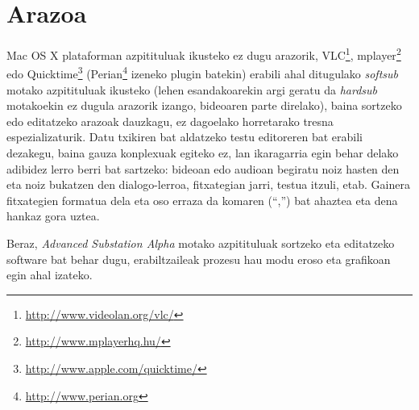 \section{Arazoa}
Mac OS X plataforman azpitituluak ikusteko ez dugu arazorik, VLC\footnote{\url{http://www.videolan.org/vlc/}}, mplayer\footnote{\url{http://www.mplayerhq.hu/}} edo Quicktime\footnote{\url{http://www.apple.com/quicktime/}} (Perian\footnote{\url{http://www.perian.org}} izeneko plugin batekin) erabili ahal ditugulako \textit{softsub} motako azpitituluak ikusteko (lehen esandakoarekin argi geratu da \textit{hardsub} motakoekin ez dugula arazorik izango, bideoaren parte direlako), baina sortzeko edo editatzeko arazoak dauzkagu, ez dagoelako horretarako tresna espezializaturik. Datu txikiren bat aldatzeko testu editoreren bat erabili dezakegu, baina gauza konplexuak egiteko ez, lan ikaragarria egin behar delako adibidez lerro berri bat sartzeko: bideoan edo audioan begiratu noiz hasten den eta noiz bukatzen den dialogo-lerroa, fitxategian jarri, testua itzuli, etab. Gainera fitxategien formatua dela eta oso erraza da komaren (``,'') bat ahaztea eta dena hankaz gora uztea.

Beraz, \textit{Advanced Substation Alpha} motako azpitituluak sortzeko eta editatzeko software bat behar dugu, erabiltzaileak prozesu hau modu eroso eta grafikoan egin ahal izateko.
